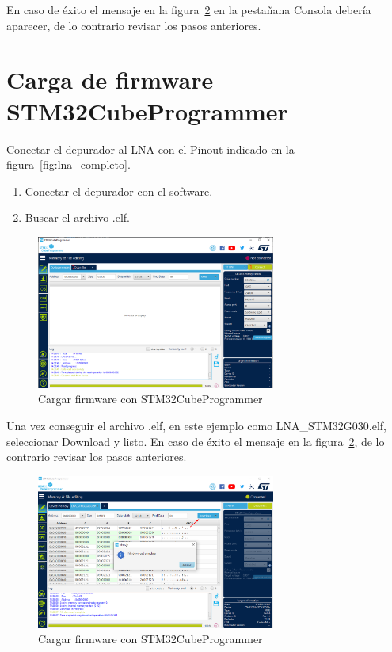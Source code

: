 \documentclass[12pt,twoside,onecolumn]{article}
\begin{document}
En caso de éxito el mensaje en la figura~\ref{fig:stm32-run-ok} en la pestañana Consola debería aparecer, de lo contrario revisar los pasos anteriores.

\section{Carga de firmware STM32CubeProgrammer}
Conectar el depurador al LNA con el Pinout indicado en la figura~\ref{fig:lna_completo}.
\begin{enumerate}
\setlength\itemsep{-0.1em}
    \item Conectar el depurador con el software.
    \item Buscar el archivo .elf.
\end{enumerate}

\begin{figure}[H]
  \centering
   \includegraphics[width=0.7\textwidth]{figures/programmer.png}
  \caption{Cargar firmware con STM32CubeProgrammer}
    \label{fig:stm32-run-ok}
\end{figure}

Una vez conseguir el archivo .elf, en este ejemplo como LNA\_STM32G030.elf, seleccionar Download y listo. En caso de éxito el mensaje en la figura~\ref{fig:stm32-run-ok}, de lo contrario revisar los pasos anteriores.

\begin{figure}[H]
  \centering
   \includegraphics[width=0.7\textwidth]{figures/programmer_download.png}
  \caption{Cargar firmware con STM32CubeProgrammer}
    \label{fig:stm32-run-ok}
\end{figure}
\end{document}
